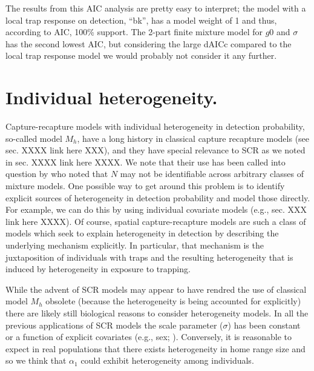 The results from this AIC analysis are pretty easy to interpret; the model
with a local trap response on detection, ``bk'', has a model weight of 1 and thus, according to AIC, 100\% support.
The 2-part finite mixture model for $g0$ and $\sigma$ has the second lowest
AIC, but considering the large dAICc compared to the local trap response model we would probably not consider it any further.  




\section{Individual heterogeneity.}

Capture-recapture models with individual heterogeneity in detection
probability, so-called model $M_{h}$, have a long history in classical
capture recapture models (see sec. XXXX link here XXX), and they have
special relevance to SCR as we noted in sec. XXXX link here XXXX.  We
note that their use has been called into question by \citet{link:2003}
who noted that $N$ may not be identifiable across arbitrary classes of
mixture models.  One possible way to get around this problem is to
identify explicit sources of heterogeneity in detection probability
and model those directly. For example, we can do this by using
individual covariate models (e.g., sec. XXX link here XXXX). Of
course, spatial capture-recapture models are such a class of models
which seek to explain heterogeneity in detection by describing the
underlying mechanism explicitly. In particular, that mechanism is the
juxtaposition of individuals with traps and the resulting
heterogeneity that is induced by heterogeneity in exposure to
trapping.

While the advent of SCR models may appear to have rendred the use of
classical model $M_h$ obsolete (because the heterogeneity is being
accounted for explicitly) there are likely still biological reasons to consider
heterogeneity models. In all the previous applications of SCR models the scale
parameter ($\sigma$) has been constant or a function of explicit covariates
(e.g., sex; \citet{gardner_etal:2010}). Conversely, it is reasonable
to expect in real populations that there exists
heterogeneity in home range size and so we think that $\alpha_{1}$
could exhibit heterogeneity among individuals. 

